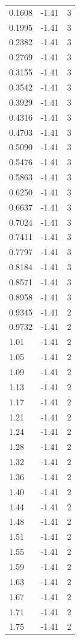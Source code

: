 \begin{longtable}{lrr}
  0.1608 & -1.41 & 3 \\
  0.1995 & -1.41 & 3 \\
  0.2382 & -1.41 & 3 \\
  0.2769 & -1.41 & 3 \\
  0.3155 & -1.41 & 3 \\
  0.3542 & -1.41 & 3 \\
  0.3929 & -1.41 & 3 \\
  0.4316 & -1.41 & 3 \\
  0.4703 & -1.41 & 3 \\
  0.5090 & -1.41 & 3 \\
  0.5476 & -1.41 & 3 \\
  0.5863 & -1.41 & 3 \\
  0.6250 & -1.41 & 3 \\
  0.6637 & -1.41 & 3 \\
  0.7024 & -1.41 & 3 \\
  0.7411 & -1.41 & 3 \\
  0.7797 & -1.41 & 3 \\
  0.8184 & -1.41 & 3 \\
  0.8571 & -1.41 & 3 \\
  0.8958 & -1.41 & 3 \\
  0.9345 & -1.41 & 2 \\
  0.9732 & -1.41 & 2 \\
  1.01 & -1.41 & 2 \\
  1.05 & -1.41 & 2 \\
  1.09 & -1.41 & 2 \\
  1.13 & -1.41 & 2 \\
  1.17 & -1.41 & 2 \\
  1.21 & -1.41 & 2 \\
  1.24 & -1.41 & 2 \\
  1.28 & -1.41 & 2 \\
  1.32 & -1.41 & 2 \\
  1.36 & -1.41 & 2 \\
  1.40 & -1.41 & 2 \\
  1.44 & -1.41 & 2 \\
  1.48 & -1.41 & 2 \\
  1.51 & -1.41 & 2 \\
  1.55 & -1.41 & 2 \\
  1.59 & -1.41 & 2 \\
  1.63 & -1.41 & 2 \\
  1.67 & -1.41 & 2 \\
  1.71 & -1.41 & 2 \\
  1.75 & -1.41 & 2 \\

\end{longtable}
